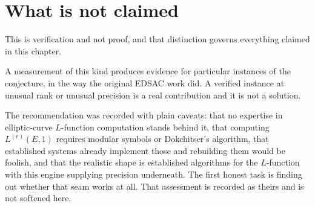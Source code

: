 \section{What is not claimed}

This is verification and not proof, and that distinction governs everything claimed in this
chapter.

A measurement of this kind produces evidence for particular instances of the conjecture, in the way
the original EDSAC work did. A verified instance at unusual rank or unusual precision is a real
contribution and it is not a solution.

The recommendation was recorded with plain caveats: that no expertise in elliptic-curve
$L$-function computation stands behind it, that computing $L^{(r)}(E,1)$ requires modular symbols or
Dokchitser's algorithm, that established systems already implement those and rebuilding them would
be foolish, and that the realistic shape is established algorithms for the $L$-function with this
engine supplying precision underneath. The first honest task is finding out whether that seam works
at all. That assessment is recorded as theirs and is not softened here.
